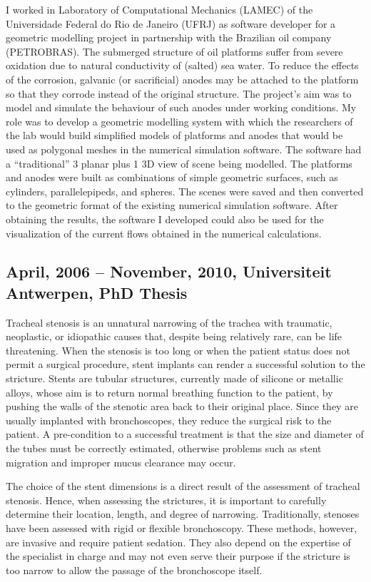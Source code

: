 \documentclass[a4paper]{article}
\begin{document}
I worked in Laboratory of Computational Mechanics (LAMEC) of the Universidade Federal do Rio de Janeiro (UFRJ) as software developer for a geometric modelling project in partnership with the Brazilian oil company (PETROBRAS). The submerged structure of oil platforms suffer from severe oxidation due to natural conductivity of (salted) sea water. To reduce the effects of the corrosion, galvanic (or sacrificial) anodes may be attached to the platform so that they corrode instead of the original structure. The project's aim was to model and simulate the behaviour of such anodes under working conditions. My role was to develop a geometric modelling system with which the researchers of the lab would build simplified models of platforms and anodes that would be used as polygonal meshes in the numerical simulation software. The software had a ``traditional'' 3 planar plus 1 3D view of scene being modelled. The platforms and anodes were built as combinations of simple geometric surfaces, such as cylinders, parallelepipeds, and spheres. The scenes were saved and then converted to the geometric format of the existing numerical simulation software. After obtaining the results, the software I developed could also be used for the visualization of the current flows obtained in the numerical calculations. 

\subsection{April, 2006 -- November, 2010, Universiteit Antwerpen, PhD Thesis}

Tracheal stenosis is an unnatural narrowing of the trachea with traumatic, neoplastic, or idiopathic causes that, despite being relatively rare, can be life threatening. When the stenosis is too long or when the patient status does not permit a surgical procedure, stent implants can render a successful solution to the stricture. Stents are tubular structures, currently made of silicone or metallic alloys, whose aim is to return normal breathing function to the patient, by pushing the walls of the stenotic area back to their original place. Since they are usually implanted with bronchoscopes, they reduce the surgical risk to the patient. A pre-condition to a successful treatment is that the size and diameter of the tubes must be correctly estimated, otherwise problems such as stent migration and improper mucus clearance may occur.

The choice of the stent dimensions is a direct result of the assessment of tracheal stenosis. Hence, when assessing the strictures, it is important to carefully determine their location, length, and degree of narrowing. Traditionally, stenoses have been assessed with rigid or flexible bronchoscopy. These methods, however, are invasive and require patient sedation. They also depend on the expertise of the specialist in charge and may not even serve their purpose if the stricture is too narrow to allow the passage of the bronchoscope itself. 
\end{document}

